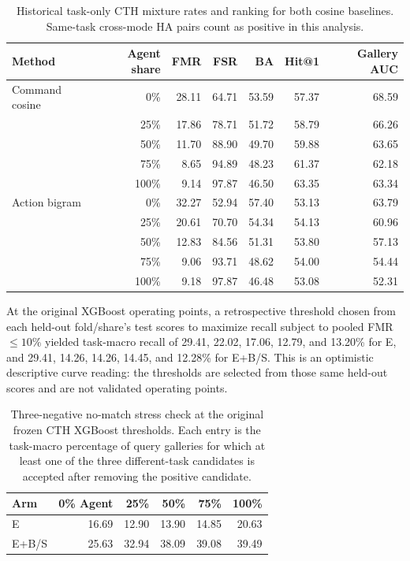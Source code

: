 \documentclass[10pt]{article}
\begin{document}
\begin{table}[ht]
\centering
\caption{Historical task-only CTH mixture rates and ranking for both cosine baselines. Same-task cross-mode HA pairs count as positive in this analysis.}
\label{tab:mixture-full}
\begin{tabular}{@{}lrrrrrr@{}}
\toprule Method & Agent share & FMR & FSR & BA & Hit@1 & Gallery AUC \\
\midrule
Command cosine & 0\% & 28.11 & 64.71 & 53.59 & 57.37 & 68.59 \\
& 25\% & 17.86 & 78.71 & 51.72 & 58.79 & 66.26 \\
& 50\% & 11.70 & 88.90 & 49.70 & 59.88 & 63.65 \\
& 75\% & 8.65 & 94.89 & 48.23 & 61.37 & 62.18 \\
& 100\% & 9.14 & 97.87 & 46.50 & 63.35 & 63.34 \\
\midrule
Action bigram & 0\% & 32.27 & 52.94 & 57.40 & 53.13 & 63.79 \\
& 25\% & 20.61 & 70.70 & 54.34 & 54.13 & 60.96 \\
& 50\% & 12.83 & 84.56 & 51.31 & 53.80 & 57.13 \\
& 75\% & 9.06 & 93.71 & 48.62 & 54.00 & 54.44 \\
& 100\% & 9.18 & 97.87 & 46.48 & 53.08 & 52.31 \\
\bottomrule
\end{tabular}
\end{table}

At the original XGBoost operating points, a retrospective threshold chosen from each held-out fold/share's test scores to maximize recall subject to pooled FMR $\leq10\%$ yielded task-macro recall of 29.41, 22.02, 17.06, 12.79, and 13.20\% for E, and 29.41, 14.26, 14.26, 14.45, and 12.28\% for E+B/S. This is an optimistic descriptive curve reading: the thresholds are selected from those same held-out scores and are not validated operating points.

\begin{table}[ht]
\centering
\caption{Three-negative no-match stress check at the original frozen CTH XGBoost thresholds. Each entry is the task-macro percentage of query galleries for which at least one of the three different-task candidates is accepted after removing the positive candidate.}
\begin{tabular}{@{}lrrrrr@{}}
\toprule Arm & 0\% Agent & 25\% & 50\% & 75\% & 100\% \\
\midrule
E & 16.69 & 12.90 & 13.90 & 14.85 & 20.63 \\
E+B/S & 25.63 & 32.94 & 38.09 & 39.08 & 39.49 \\
\bottomrule
\end{tabular}
\end{table}
\end{document}
